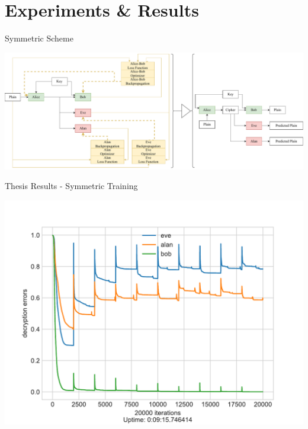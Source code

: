 \documentclass{beamer}
\begin{document}
		\section{Experiments \& Results}
		\begin{frame}{Symmetric Scheme}
			\begin{center}
				\includegraphics[width=\textwidth, height=0.8\textheight]{symmetricScheme-present}
			\end{center}
		\end{frame}
		\begin{frame}{Thesis Results - Symmetric Training}
			\begin{center}
				\includegraphics[height=0.9\textheight]{neurencoder-symmetric-training}
			\end{center}
		\end{frame}
\end{document}
